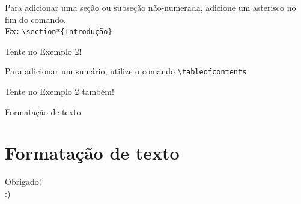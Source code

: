 \documentclass[12pt]{beamer}
\begin{document}
\begin{frame}[fragile]
  Para adicionar uma seção ou subseção não-numerada, adicione um asterisco no fim do comando.\\
  \medskip
  \textbf{Ex:} \verb+\section*{Introdução}+
  \medskip

  Tente no Exemplo 2!
\end{frame}

\begin{frame}[fragile]
  Para adicionar um sumário, utilize o comando \verb+\tableofcontents+
  \bigskip

  Tente no Exemplo 2 também!
\end{frame}

\begin{frame}{Formatação de texto}
  \section{Formatação de texto}
\end{frame}

\begin{frame}
  \begin{center}
    \large Obrigado!\\
    :)
  \end{center}
\end{frame}
\end{document}
